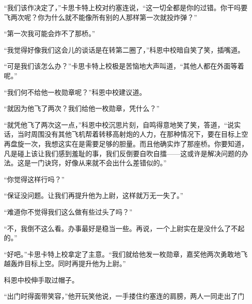     “我们该作决定了，”卡思卡特上校对约塞连说，“这一切全都是你的过错。你干吗要飞两次呢？你为什么就不能像所有别的人那样第一次就投炸弹？”

    “第一次我可能会炸不了那桥。”

    “我觉得好像我们这会儿的谈话是在转第二圈了，”科恩中校暗自笑了笑，插嘴道。

    “可是我们该怎么办？”卡思卡特上校极是苦恼地大声叫道，“其他人都在外面等着呢。”

    “我们何不给他一枚勋章呢？”科恩中校建议道。

    “就因为他飞了两次？我们给他一枚勋章，凭什么？”

    “就凭他飞了两次这一点，”科恩中校沉思片刻，自鸣得意地笑了笑，答道，“说实话，当时周围没有其他飞机帮着转移高射炮的人力，在那种情况下，要在目标上空再盘旋一次，我想这实在是需要足够的胆量。而且他确实炸了那座桥。你要知道，凡是碰上该让我们感到羞耻的事，我们反倒要自吹自擂——这或许是解决问题的办法。这是一门诀窍，好像从来就不会出什么差错似的。”

    “你觉得这样行吗？”

    “保证没问题。让我们再提升他为上尉，这样就万无一失了。”

    “难道你不觉得我们这么做有些过头了吗？”

    “不，我倒不这么看。办事最好是稳当一些。再说，一个上尉实在是没什么了不起的。”

    “好吧。”卡思卡特上校拿定了主意。“我们就给他发一枚勋章，嘉奖他两次勇敢地飞越轰炸目标上空。同时再提升他为上尉。”

    科恩中校伸手取过帽子。

    “出门时得面带笑容，”他开玩笑他说，一手搂住约塞连的肩膀，两人一同走出了门
